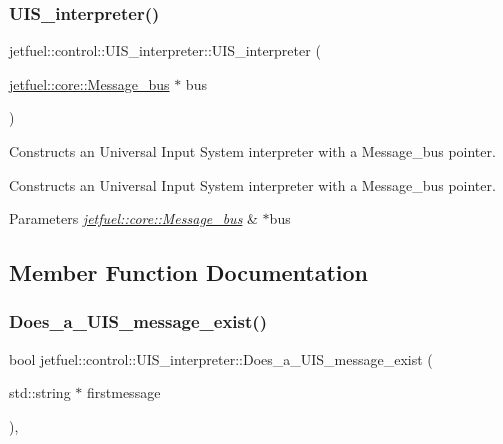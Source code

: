\subsubsection{\texorpdfstring{U\+I\+S\+\_\+interpreter()}{UIS\_interpreter()}}
{\footnotesize\ttfamily jetfuel\+::control\+::\+U\+I\+S\+\_\+interpreter\+::\+U\+I\+S\+\_\+interpreter (\begin{DoxyParamCaption}\item[{\hyperlink{classjetfuel_1_1core_1_1Message__bus}{jetfuel\+::core\+::\+Message\+\_\+bus} $\ast$}]{bus }\end{DoxyParamCaption})}



Constructs an Universal Input System interpreter with a Message\+\_\+bus pointer. 

Constructs an Universal Input System interpreter with a Message\+\_\+bus pointer.


\begin{DoxyParams}{Parameters}
{\em \hyperlink{classjetfuel_1_1core_1_1Message__bus}{jetfuel\+::core\+::\+Message\+\_\+bus}} & $\ast$bus \\
\hline
\end{DoxyParams}


\subsection{Member Function Documentation}
\mbox{\label{classjetfuel_1_1control_1_1UIS__interpreter_a78d705a1fa28b4ee0ff168f70707f1ee}} 
\subsubsection{\texorpdfstring{Does\+\_\+a\+\_\+\+U\+I\+S\+\_\+message\+\_\+exist()}{Does\_a\_UIS\_message\_exist()}}
{\footnotesize\ttfamily bool jetfuel\+::control\+::\+U\+I\+S\+\_\+interpreter\+::\+Does\+\_\+a\+\_\+\+U\+I\+S\+\_\+message\+\_\+exist (\begin{DoxyParamCaption}\item[{std\+::string $\ast$}]{firstmessage }\end{DoxyParamCaption})\hspace{0.3cm}{\ttfamily [inline]}, {\ttfamily [protected]}}



